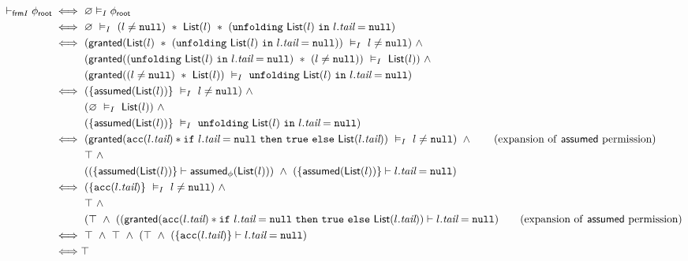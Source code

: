 \begin{align*}
\selfframing \phiroot
\iff & \
\empty \frames \phiroot
\\ \iff & \
\empty \ \frames \
(l \neq \cnull) \ \ast \
\List(l) \ \ast \
(\cunfolding \ \List(l) \ \cin \ l.\vtail = \cnull)
\\ \iff & \
  ( \granted( \List(l) \ \ast \ (\cunfolding \ \List(l) \ \cin \ l.\vtail = \cnull) ) \ \frames \
    l \neq \cnull )
  \ \land \\ & \
  ( \granted( (\cunfolding \ \List(l) \ \cin \ l.\vtail = \cnull) \ \ast \ (l \neq \cnull)) \ \frames \
    \List(l) )
  \ \land \\ & \
  (\granted( (l \neq \cnull) \ \ast \ \List(l) ) \ \frames \
    \cunfolding \ \List(l) \ \cin \ l.\vtail = \cnull )
\\ \iff & \
  ( \set{ \assumed(\List(l)) } \ \frames \ l \neq \cnull ) \ \land \\ & \
  ( \empty \ \frames \ \List(l) ) \ \land \\ & \
  ( \set{ \assumed(\List(l)) } \ \frames \ \cunfolding \ \List(l) \ \cin \ l.\vtail = \cnull )
\\ \iff & \
  ( \granted( \cacc(l.\vtail) \ast \cif \ l.\vtail = \cnull \ \cthen \ \ctrue \ \celse \ \List(l.\vtail) ) \ \frames \ l \neq \cnull ) \ \land \tag{expansion of \assumed \ permission} \\ & \
  \top \ \land \\ & \
  ( ( \set{ \assumed(\List(l)) } \entails \assumed_\phi(\List(l)) ) \ \land \
    ( \set{ \assumed(\List(l)) } \entails l.\vtail = \cnull )
\\ \iff & \
  ( \set{ \cacc(l.\vtail) } \ \frames \ l \neq \cnull ) \ \land \\ & \
  \top \ \land \\ & \
  ( \top \ \land \
    ( ( \granted( \cacc(l.\vtail) \ast \cif \ l.\vtail = \cnull \ \cthen \ \ctrue \ \celse \ \List(l.\vtail) ) \entails l.\vtail = \cnull )
    \tag{expansion of \assumed \ permission}
\\ \iff & \
  \top \ \land \
  \top \ \land \
  ( \top \ \land \
    ( \set{ \cacc(l.\vtail) } \entails l.\vtail = \cnull )
\\ \iff &
  \top
\end{align*}

\newpage
